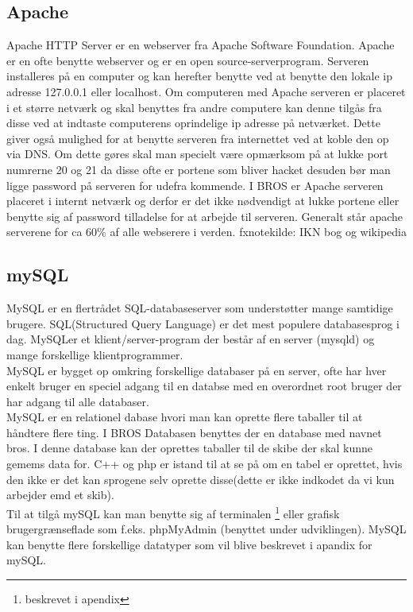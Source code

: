 \subsection{Apache}
Apache HTTP Server er en webserver fra Apache Software Foundation. Apache er en ofte benytte webserver og er en open source-serverprogram. Serveren installeres på en computer og kan herefter benytte ved at benytte den lokale ip adresse 127.0.0.1 eller localhost. Om computeren med Apache serveren er placeret i et større netværk og skal benyttes fra andre computere kan denne tilgås fra disse ved at indtaste computerens oprindelige ip adresse på netværket. Dette giver også mulighed for at benytte serveren fra internettet ved at koble den op via DNS. Om dette gøres skal man specielt være opmærksom på at lukke port numrerne 20 og 21 da disse ofte er portene som bliver hacket desuden bør man ligge password på serveren for udefra kommende. I BROS er Apache serveren placeret i internt netværk og derfor er det ikke nødvendigt at lukke portene eller benytte sig af password tilladelse for at arbejde til serveren.
Generalt står apache serverene for ca 60\% af alle webserere i verden.
fxnote{kilde: IKN bog og wikipedia} 

\subsection{mySQL}
MySQL er en flertrådet SQL-databaseserver som understøtter mange samtidige brugere. SQL(Structured Query Language) er det mest populere databasesprog i dag. MySQLer et klient/server-program der består af en server (mysqld) og mange forskellige klientprogrammer.\\
MySQL er bygget op omkring forskellige databaser på en server, ofte har hver enkelt bruger en speciel adgang til en databse med en overordnet root bruger der har adgang til alle databaser.\\
MySQL er en relationel dabase hvori man kan oprette flere taballer til at håndtere flere ting. I BROS Databasen benyttes der en database med navnet bros. I denne database kan der oprettes taballer til de skibe der skal kunne gemems data for. C++ og php er istand til at se på om en tabel er oprettet, hvis den ikke er det kan sprogene selv oprette disse(dette er ikke indkodet da vi kun arbejder emd et skib). \\
Til at tilgå mySQL kan man benytte sig af terminalen \footnote{beskrevet i apendix} eller grafisk brugergrænseflade som f.eks. phpMyAdmin (benyttet under udviklingen).
MySQL kan benytte flere forskellige datatyper som vil blive beskrevet i apandix for mySQL. 






